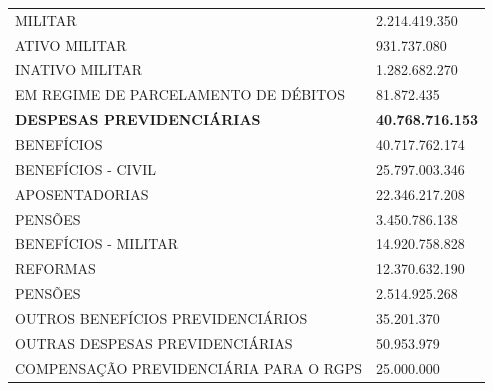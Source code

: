 \documentclass{article}
\begin{document}
\begin{longtable}[c]{m{12cm}m{3cm}}
\multicolumn{1}{L{12cm}}{\hspace{6em} MILITAR} & \multicolumn{1}{R{3cm}}{2.214.419.350} \\
\multicolumn{1}{L{12cm}}{\hspace{8em} ATIVO MILITAR} & \multicolumn{1}{R{3cm}}{931.737.080} \\
\multicolumn{1}{L{12cm}}{\hspace{8em} INATIVO MILITAR} & \multicolumn{1}{R{3cm}}{1.282.682.270} \\
\multicolumn{1}{L{12cm}}{\hspace{6em} EM REGIME DE PARCELAMENTO DE DÉBITOS} & \multicolumn{1}{R{3cm}}{81.872.435} \\
\hline\hline
\multicolumn{1}{L{12cm}}{\hspace{0em} \textbf{ DESPESAS PREVIDENCIÁRIAS }} & \multicolumn{1}{R{3cm}}{\textbf{ 40.768.716.153 }} \\
\multicolumn{1}{L{12cm}}{\hspace{2em} BENEFÍCIOS} & \multicolumn{1}{R{3cm}}{40.717.762.174} \\
\multicolumn{1}{L{12cm}}{\hspace{4em} BENEFÍCIOS -  CIVIL} & \multicolumn{1}{R{3cm}}{25.797.003.346} \\
\multicolumn{1}{L{12cm}}{\hspace{6em} APOSENTADORIAS} & \multicolumn{1}{R{3cm}}{22.346.217.208} \\
\multicolumn{1}{L{12cm}}{\hspace{6em} PENSÕES} & \multicolumn{1}{R{3cm}}{3.450.786.138} \\
\multicolumn{1}{L{12cm}}{\hspace{4em} BENEFÍCIOS - MILITAR} & \multicolumn{1}{R{3cm}}{14.920.758.828} \\
\multicolumn{1}{L{12cm}}{\hspace{6em} REFORMAS} & \multicolumn{1}{R{3cm}}{12.370.632.190} \\
\multicolumn{1}{L{12cm}}{\hspace{6em} PENSÕES} & \multicolumn{1}{R{3cm}}{2.514.925.268} \\
\multicolumn{1}{L{12cm}}{\hspace{6em} OUTROS BENEFÍCIOS PREVIDENCIÁRIOS} & \multicolumn{1}{R{3cm}}{35.201.370} \\
\multicolumn{1}{L{12cm}}{\hspace{2em} OUTRAS DESPESAS PREVIDENCIÁRIAS} & \multicolumn{1}{R{3cm}}{50.953.979} \\
\multicolumn{1}{L{12cm}}{\hspace{4em} COMPENSAÇÃO PREVIDENCIÁRIA PARA O RGPS} & \multicolumn{1}{R{3cm}}{25.000.000} \\

\end{longtable}
\end{document}
